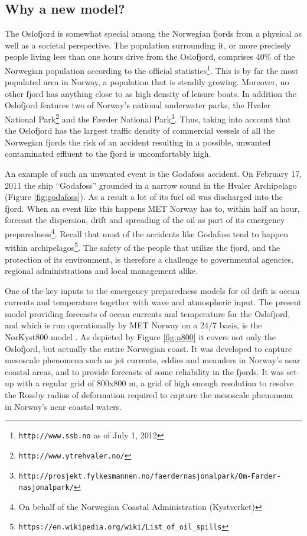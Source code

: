 \subsection{Why a new model?}
The Oslofjord is somewhat special among the Norwegian fjords from a physical as well as a societal perspective. The population surrounding it, or more precisely people living less than one hours drive from the Oslofjord, comprises 40\% of the Norwegian population according to the official statistics\footnote{\texttt{http://www.ssb.no} as of July 1, 2012}. This is by far the most populated area in Norway, a population that is steadily growing. Moreover, no other fjord has anything close to as high density of leisure boats. In addition the Oslofjord features two of Norway's national underwater parks, the Hvaler National Park\footnote{\texttt{http://www.ytrehvaler.no/}} and the F{\ae}rder National Park\footnote{\texttt{http://prosjekt.fylkesmannen.no/faerdernasjonalpark/Om-Farder-nasjonalpark/}}. Thus, taking into account that the Oslofjord has the largest traffic density of commercial vessels of all the Norwegian fjords the risk of an accident resulting in a possible, unwanted contaminated effluent to the fjord is uncomfortably high. 
 

An example of such an unwanted event is the Godafoss accident. On February 17, 2011 the ship ``Godafoss'' grounded in a narrow sound in the Hvaler Archipelago (Figure \ref{fig:godafoss}). As a result a lot of its fuel oil was discharged into the fjord. When an event like this happens MET Norway has to, within half an hour, forecast the dispersion, drift and spreading of the oil as part of its emergency preparedness\footnote{On behalf of the Norwegian Coastal Administration (Kystverket)}. Recall that most of the accidents like Godafoss tend to happen within archipelagos\footnote{\texttt{https://en.wikipedia.org/wiki/List\_of\_oil\_spills}}. The safety of the people that utilize the fjord, and the protection of its environment, is therefore a challenge to governmental agencies, regional administrations and local management alike. 

One of the key inputs to the emergency preparedness models for oil drift is ocean currents and temperature together with wave and atmospheric input. The present model providing forecasts of ocean currents and temperature for the Oslofjord, and which is run operationally by MET Norway on a 24/7 basis, is the NorKyst800 model \citep{albre:etal:2011}. As depicted by Figure \ref{fig:n800} it covers not only the Oslofjord, but actually the entire Norwegian coast. It was developed to capture mesoscale phenomena such as jet currents, eddies and meanders in Norway's near coastal areas, and to provide forecasts of some reliability in the fjords. It was set-up with a regular grid of 800x800 m, a grid of high enough resolution to resolve the Rossby radius of deformation required to capture the mesoscale phenomena in Norway's near coastal waters. 


